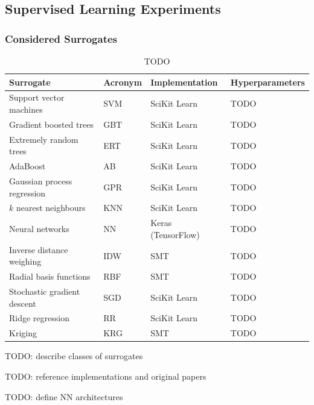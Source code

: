 \subsection{Supervised Learning Experiments}
\label{sec:supervised}

\subsubsection{Considered Surrogates}

\begin{table}[h]
	\centering
	\begin{tabular}{llll}
	\toprule
	Surrogate & Acronym & Implementation & Hyperparameters \\
	\midrule
	Support vector machines	& SVM & SciKit Learn & TODO \\
	Gradient boosted trees	& GBT & SciKit Learn & TODO \\
	Extremely random trees	& ERT & SciKit Learn & TODO \\
	AdaBoost	& AB & SciKit Learn & TODO \\
	Gaussian process regression	& GPR & SciKit Learn & TODO \\
	$k$ nearest neighbours	& KNN & SciKit Learn & TODO \\
	Neural networks	& NN & Keras (TensorFlow) & TODO \\
	Inverse distance weighing & IDW & SMT & TODO \\
	Radial basis functions & RBF & SMT & TODO \\
	Stochastic gradient descent & SGD & SciKit Learn & TODO \\
	Ridge regression & RR & SciKit Learn & TODO \\
	Kriging & KRG & SMT & TODO \\
	\bottomrule
	\end{tabular}
	\caption{TODO}
	\label{tbl:surrogates}
\end{table}

TODO: describe classes of surrogates

TODO: reference implementations and original papers

TODO: define NN architectures

